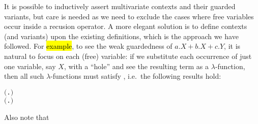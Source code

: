 It is possible to inductively assert multivariate contexts and their
guarded variants, but care is needed as  we need to exclude the cases where
free variables occur inside a recusion operator. A more elegant
 solution is to define \multivariate contexts (and variants) upon the
existing \univariate definitions, which is the approach we have followed.
For \hl{example}, to see the weak guardedness of $a.X + b.X + c.Y$, it is
natural to focus on each (free) variable: if we substitute each
occurrence of just one variable, say $X$, with a ``hole'' and see the
resulting term as a $\lambda$-function, then all such $\lambda$-functions
must satisfy , i.e.~the following results hold:
\begin{alltt}
\HOLTokenTurnstile{}  \ensuremath{(}\HOLTokenLambda{}. \HOLSymConst{\ensuremath{\ldotp}} \HOLSymConst{\ensuremath{+}} \HOLSymConst{\ensuremath{\ldotp}} \HOLSymConst{\ensuremath{+}} \HOLSymConst{\ensuremath{\ldotp}} \ensuremath{)}
\HOLTokenTurnstile{}  \ensuremath{(}\HOLTokenLambda{}. \HOLSymConst{\ensuremath{\ldotp}}  \HOLSymConst{\ensuremath{+}} \HOLSymConst{\ensuremath{\ldotp}}  \HOLSymConst{\ensuremath{+}} \HOLSymConst{\ensuremath{\ldotp}}\ensuremath{)}
\end{alltt}
Also note that 
